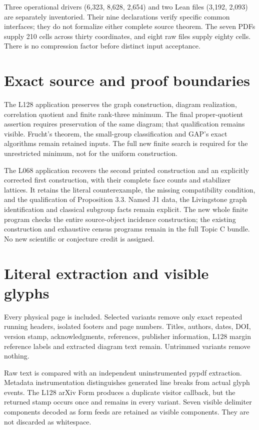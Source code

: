 \documentclass[11pt,a4paper]{article}
\begin{document}
Three operational drivers (6,323, 8,628, 2,654) and two Lean files (3,192, 2,093) are separately inventoried. Their nine declarations verify specific common interfaces; they do not formalize either complete source theorem. The seven PDFs supply 210 cells across thirty coordinates, and eight raw files supply eighty cells. There is no compression factor before distinct input acceptance.
\newpage
\section*{Exact source and proof boundaries}
The L128 application preserves the graph construction, diagram realization, correlation quotient and finite rank-three minimum. The final proper-quotient assertion requires preservation of the same diagram; that qualification remains visible. Frucht's theorem, the small-group classification and GAP's exact algorithms remain retained inputs. The full new finite search is required for the unrestricted minimum, not for the uniform construction.

The L068 application recovers the second printed construction and an explicitly corrected first construction, with their complete face counts and stabilizer lattices. It retains the literal counterexample, the missing compatibility condition, and the qualification of Proposition 3.3. Named J1 data, the Livingstone graph identification and classical subgroup facts remain explicit. The new whole finite program checks the entire source-object incidence construction; the existing construction and exhaustive census programs remain in the full Topic C bundle. No new scientific or conjecture credit is assigned.

\section*{Literal extraction and visible glyphs}
Every physical page is included. Selected variants remove only exact repeated running headers, isolated footers and page numbers. Titles, authors, dates, DOI, version stamp, acknowledgments, references, publisher information, L128 margin reference labels and extracted diagram text remain. Untrimmed variants remove nothing.

Raw text is compared with an independent uninstrumented pypdf extraction. Metadata instrumentation distinguishes generated line breaks from actual glyph events. The L128 arXiv Form produces a duplicate visitor callback, but the returned stamp occurs once and remains in every variant. Seven visible delimiter components decoded as form feeds are retained as visible components. They are not discarded as whitespace.
\end{document}
